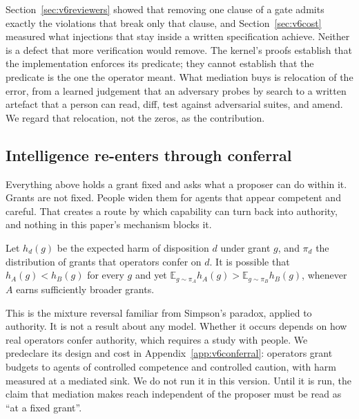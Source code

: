 Section~\ref{sec:v6reviewers} showed that removing one clause of a gate admits exactly the violations that break only
that clause, and Section~\ref{sec:v6cost} measured what injections that stay inside a written specification achieve.
Neither is a defect that more verification would remove. The kernel's proofs establish that the
implementation enforces its predicate; they cannot establish that the predicate is the one the operator meant. What
mediation buys is relocation of the error, from a learned judgement that an adversary probes by search to a written
artefact that a person can read, diff, test against adversarial suites, and amend. We regard that relocation, not the
zeros, as the contribution.

\subsection{Intelligence re-enters through conferral}

Everything above holds a grant fixed and asks what a proposer can do within it. Grants are not fixed. People widen
them for agents that appear competent and careful. That creates a route by which capability can turn back into
authority, and nothing in this paper's mechanism blocks it.

\begin{observation}\label{obs:conferral}
Let \(h_d(g)\) be the expected harm of disposition \(d\) under grant \(g\), and \(\pi_d\) the distribution of grants
that operators confer on \(d\). It is possible that \(h_A(g) < h_B(g)\) for every \(g\) and yet
\(\mathbb{E}_{g\sim\pi_A} h_A(g) > \mathbb{E}_{g\sim\pi_B} h_B(g)\), whenever \(A\) earns sufficiently broader grants.
\end{observation}

This is the mixture reversal familiar from Simpson's paradox, applied to authority. It is not a result about any model.
Whether it occurs depends on how real operators confer authority, which requires a study with people. We predeclare its
design and cost in Appendix~\ref{app:v6conferral}: operators grant budgets to agents of controlled competence and
controlled caution, with harm measured at a mediated sink. We do not run it in this version. Until it is run, the claim
that mediation makes reach independent of the proposer must be read as ``at a fixed grant''.
